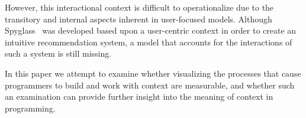 
However, this interactional context is difficult to operationalize due to the transitory and internal aspects inherent in user-focused models. Although Spyglass~\cite{Viriyakattiyaporn:2010} was developed based upon a user-centric context in order to create an intuitive recommendation system, a model that accounts for the interactions of such a system is still missing.


In this paper we attempt to examine whether visualizing the processes that cause programmers to build and work with context are measurable, and whether such an examination can provide further insight into the meaning of context in programming. 